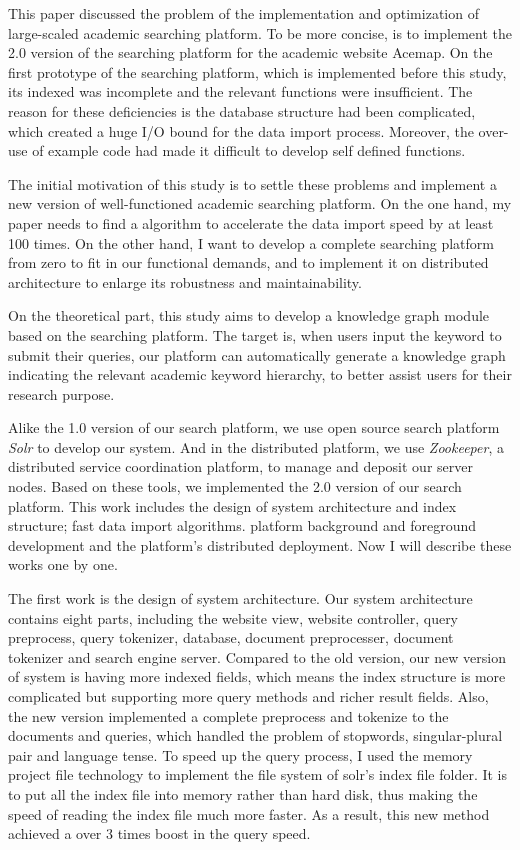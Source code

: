 \begin{bigabstract}
This paper discussed the problem of the implementation and optimization of large-scaled academic searching platform. To be more concise, is to implement the 2.0 version of the searching platform for the academic website Acemap. On the first prototype of the searching platform, which is implemented before this study, its indexed was incomplete and the relevant functions were insufficient. The reason for these deficiencies is the database structure had been complicated, which created a huge I/O bound for the data import process. Moreover, the over-use of example code had made it difficult to develop self defined functions.

The initial motivation of this study is to settle these problems and implement a new version of well-functioned academic searching platform. On the one hand, my paper needs to find a algorithm to accelerate the data import speed by at least 100 times. On the other hand, I want to develop a complete searching platform from zero to fit in our functional demands, and to implement it on distributed architecture to enlarge its robustness and maintainability.

On the theoretical part, this study aims to develop a knowledge graph module based on the searching platform. The target is, when users input the keyword to submit their queries, our platform can automatically generate a knowledge graph indicating the relevant academic keyword hierarchy, to better assist users for their research purpose.

Alike the 1.0 version of our search platform, we use open source search platform \emph{Solr} to develop our system. And in the distributed platform, we use \emph{Zookeeper}, a distributed service coordination platform, to manage and deposit our server nodes. Based on these tools, we implemented the 2.0 version of our search platform. This work includes the design of system architecture and index structure; fast data import algorithms. platform background and foreground development and the platform's distributed deployment. Now I will describe these works one by one.

The first work is the design of system architecture. Our system architecture contains eight parts, including the website view, website controller, query preprocess, query tokenizer, database, document preprocesser, document tokenizer and search engine server. Compared to the old version, our new version of system is having more indexed fields, which means the index structure is more complicated but supporting more query methods and richer result fields. Also, the new version implemented a complete preprocess and tokenize to the documents and queries, which handled the problem of stopwords, singular-plural pair and language tense. To speed up the query process, I used the memory project file technology to implement the file system of solr's index file folder. It is to put all the index file into memory rather than hard disk, thus making the speed of reading the index file much more faster. As a result, this new method achieved a over 3 times boost in the query speed.


\end{bigabstract}
